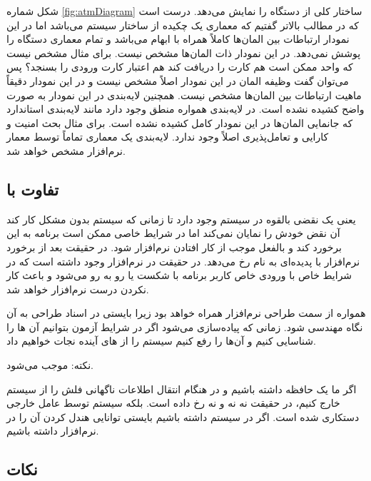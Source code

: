 \documentclass[a4paper]{article}
\begin{document}
شکل شماره \ref{fig:atmDiagram} ساختار کلی از دستگاه  را نمایش می‌دهد.
درست است که در مطالب بالاتر گفتیم که معماری یک چکیده از ساختار سیستم می‌باشد اما
در این نمودار ارتباطات بین المان‌ها کاملاً همراه با ابهام می‌باشد و تمام معماری
دستگاه  را پوشش نمی‌دهد. در این نمودار ذات المان‌ها مشخص نیست. برای مثال
مشخص نیست که واحد  ممکن است هم کارت را دریافت کند هم اعتبار
کارت ورودی را بسنجد؟ پس می‌توان گفت وظیفه المان  در این
نمودار اصلاً مشخص نیست و در این نمودار دقیقاً ماهیت ارتباطات بین المان‌ها مشخص
نیست. همچنین لایه‌بندی در این نمودار به صورت واضح کشیده نشده است. در لایه‌بندی
همواره منطق وجود دارد مانند لایه‌بندی استاندارد  که جانمایی المان‌ها در
این نمودار کامل کشیده نشده است. برای مثال بحث امنیت و کارایی و تعامل‌پذیری اصلاً
وجود ندارد. لایه‌بندی یک معماری تماماً توسط معمار نرم‌افزار مشخص خواهد شد.

\subsection{تفاوت  با }

 یعنی یک نقضی بالقوه در سیستم وجود دارد تا زمانی که سیستم بدون مشکل
کار کند آن نقض خودش را نمایان نمی‌کند اما در شرایط خاصی ممکن است برنامه به این
 برخورد کند و بالفعل موجب از کار افتادن نرم‌افزار شود. در حقیقت بعد از
برخورد نرم‌افزار با  پدیده‌ای به نام  رخ می‌دهد. در حقیقت
 در نرم‌افزار وجود داشته است که در شرایط خاص با ورودی خاص کاربر برنامه
با شکست یا  رو به رو می‌شود و باعث کار نکردن درست نرم‌افزار خواهد
شد.

همواره  از سمت طراحی نرم‌افزار همراه خواهد بود زیرا بایستی در اسناد
طراحی به آن نگاه مهندسی شود. زمانی که پیاده‌سازی می‌شود اگر در شرایط آزمون
بتوانیم آن ها را شناسایی کنیم و آن‌ها را رفع کنیم سیستم را از
های آینده نجات خواهیم داد.

نکته:  موجب  می‌شود.

اگر ما یک حافظه  داشته باشیم و در هنگام انتقال اطلاعات ناگهانی فلش را از
سیستم خارج کنیم، در حقیقت نه  نه  و نه  رخ داده
است. بلکه سیستم توسط عامل خارجی دستکاری شده است. اگر  در سیستم داشته
باشیم بایستی توانایی هندل کردن آن را در نرم‌افزار داشته باشیم.

\subsection*{نکات}
\end{document}

